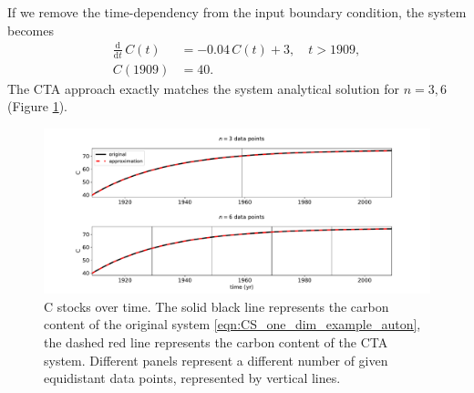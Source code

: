 \documentclass[11pt,a4paper]{article}
\newcommand{\deriv}[1]{\frac{\mathrm{d}}{\mathrm{d}#1}}
\begin{document}
If we remove the time-dependency from the input boundary condition, the system becomes
\begin{equation}\label{eqn:CS_one_dim_example_auton}
    \begin{aligned}
        \deriv{t}\,C(t) &= -0.04\,C(t) + 3,\quad t>1909,\\
        C(1909) &= 40.
    \end{aligned}
\end{equation}
The CTA approach exactly matches the system analytical solution for $n=3,6$ (Figure \ref{fig:CS_one_dim_example_auton}).

\begin{figure}[htbp]
    \centering 
    \includegraphics[width=1.0\linewidth]{figs/interpol_pwc_1_auton.pdf}
    \caption{C stocks over time.
        The solid black line represents the carbon content of the original system \eqref{eqn:CS_one_dim_example_auton}, the dashed red line represents the carbon content of the CTA system.
        Different panels represent a different number of given equidistant data points, represented by vertical lines.
        }
    \label{fig:CS_one_dim_example_auton}
\end{figure}        
\end{document}
